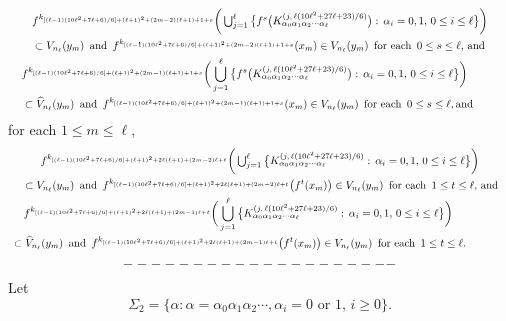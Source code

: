 \documentclass[12pt]{article}
\newcommand{\al}{\alpha}
\begin{document}
\begin{multline*}
$$
f^{k_{[(\ell-1)(10\ell^2+7\ell+6)/6]+(\ell+1)^2+(2m-2)(\ell+1)+1+s}}\bigg(\bigcup_{j=1}^\ell \big\{ f^s\big(K_{\al_0\al_1\al_2\cdots\al_\ell}^{(j, \, \ell(10\ell^2+27\ell+23)/6)}\big): \, \al_i = 0, 1, \, 0 \le i \le \ell \big\}\bigg) \\ 
\subset V_{n_\ell}(y_m) \,\,\, \text{and} \,\,\, f^{k_{[(\ell-1)(10\ell^2+7\ell+6)/6]+(\ell+1)^2+(2m-2)(\ell+1)+1+s}}(x_m) \in V_{n_\ell}(y_m) \,\,\, \text{for each} \,\,\, 0 \le s \le \ell, \, \text{and} \\
\,\,\,\,\, f^{k_{[(\ell-1)(10\ell^2+7\ell+6)/6]+(\ell+1)^2+(2m-1)(\ell+1)+1+s}}\bigg(\bigcup_{j=1}^\ell \big\{f^s\big(K_{\al_0\al_1\al_2\cdots\al_\ell}^{(j, \, \ell(10\ell^2+27\ell+23)/6)}\big): \, \al_i = 0, 1, \, 0 \le i \le \ell \big\}\bigg) \qquad\quad\,\,\,\, \\ 
\quad\,\,\, \subset \widehat V_{n_\ell}(y_m) \,\,\, \text{and} \,\,\, f^{k_{[(\ell-1)(10\ell^2+7\ell+6)/6]+(\ell+1)^2+(2m-1)(\ell+1)+1+s}}(x_m) \in V_{n_\ell}(y_m) \,\,\, \text{for each} \,\,\, 0 \le s \le \ell, \text{and} \qquad\quad\,\,\,
$$
\end{multline*}
for each $1 \le m \le \ell$, 
\begin{multline*}
$$
f^{k_{[(\ell-1)(10\ell^2+7\ell+6)/6]+(\ell+1)^2+2\ell(\ell+1)+(2m-2)\ell+t}}\bigg(\bigcup_{j=1}^\ell \big\{ K_{\al_0\al_1\al_2\cdots\al_\ell}^{(j, \,\ell(10\ell^2+27\ell+23)/6)}: \, \al_i = 0, 1, \, 0 \le i \le \ell \big\}\bigg) \\ 
\,\, \subset V_{n_\ell}(y_m) \,\,\, \text{and} \,\,\, f^{k_{[(\ell-1)(10\ell^2+7\ell+6)/6]+(\ell+1)^2+2\ell(\ell+1)+(2m-2)\ell+t}}\big(f^{t}(x_m)\big) \in V_{n_\ell}(y_m) \,\,\, \text{for each} \,\,\, 1 \le t \le \ell, \, \text{and} \\
\,\,\,\,\, f^{k_{[(\ell-1)(10\ell^2+7\ell+6)/6]+(\ell+1)^2+2\ell(\ell+1)+(2m-1)\ell+t}}\bigg(\bigcup_{j=1}^\ell \big\{ K_{\al_0\al_1\al_2\cdots\al_\ell}^{(j, \,\ell(10\ell^2+27\ell+23)/6)}: \, \al_i = 0, 1, \, 0 \le i \le \ell \big\}\bigg) \qquad\qquad\,\,\,\,\, \\ 
\,\,\, \subset \widehat V_{n_\ell}(y_m) \,\,\, \text{and} \,\,\, f^{k_{[(\ell-1)(10\ell^2+7\ell+6)/6]+(\ell+1)^2+2\ell(\ell+1)+(2m-1)\ell+t}}\big(f^{t}(x_m)\big) \in V_{n_\ell}(y_m) \,\,\, \text{for each} \,\,\, 1 \le t \le \ell.\qquad\qquad\,
$$
\end{multline*}
$$--------------------\vspace{.1in}$$
\indent Let
$$
\Sigma_2 = \{ \al : \al = \al_0\al_1\al_2 \cdots, \al_i = 0 \,\, \text{or} \,\, 1, \, i \ge 0 \}.
$$
\end{document}
